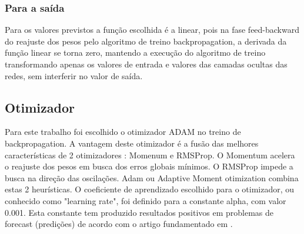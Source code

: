     	\subsubsection{Para a saída}
    	    Para os valores previstos a função escolhida é a linear, pois na fase feed-backward do reajuste dos pesos pelo algoritmo de treino backpropagation, a derivada da função linear se torna zero, mantendo a execução do algoritmo de treino transformando apenas os valores de entrada e valores das camadas ocultas das redes, sem interferir no valor de saída.
    \subsection{Otimizador}
        \begin{figure}[H]
        	 \label{fig:otimizadores}
        \end{figure}
        Para este trabalho foi escolhido o otimizador ADAM no treino de backpropagation.
        A vantagem deste otimizador é a fusão das melhores características de 2 otimizadores :\newline 
         Momenum e RMSProp. \newline
        O Momentum acelera o reajuste dos pesos em busca dos erros globais mínimos.\newline
         O RMSProp impede a busca na direção das oscilações.\newline
         Adam ou Adaptive Moment otimization combina estas 2 heurísticas.
        O coeficiente de aprendizado escolhido para o otimizador, ou conhecido como "learning rate", foi definido para a constante alpha, com valor 0.001.
        Esta constante tem produzido resultados positivos em problemas de forecast (predições) de acordo com o artigo fundamentado em \cite{MLM}.

